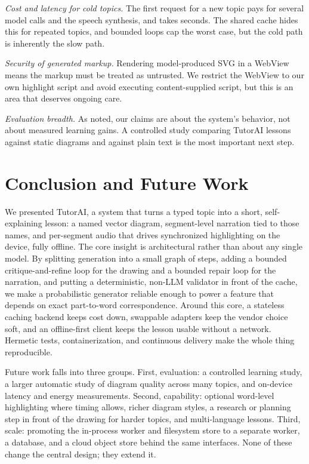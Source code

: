 \documentclass[conference]{IEEEtran}
\begin{document}
\emph{Cost and latency for cold topics.} The first request for a new topic pays
for several model calls and the speech synthesis, and takes seconds. The shared
cache hides this for repeated topics, and bounded loops cap the worst case, but
the cold path is inherently the slow path.

\emph{Security of generated markup.} Rendering model-produced SVG in a WebView
means the markup must be treated as untrusted. We restrict the WebView to our own
highlight script and avoid executing content-supplied script, but this is an area
that deserves ongoing care.

\emph{Evaluation breadth.} As noted, our claims are about the system's behavior,
not about measured learning gains. A controlled study comparing TutorAI lessons
against static diagrams and against plain text is the most important next step.

\section{Conclusion and Future Work}
\label{sec:conclusion}

We presented TutorAI, a system that turns a typed topic into a short,
self-explaining lesson: a named vector diagram, segment-level narration tied to
those names, and per-segment audio that drives synchronized highlighting on the
device, fully offline. The core insight is architectural rather than about any
single model. By splitting generation into a small graph of steps, adding a
bounded critique-and-refine loop for the drawing and a bounded repair loop for
the narration, and putting a deterministic, non-LLM validator in front of the
cache, we make a probabilistic generator reliable enough to power a feature that
depends on exact part-to-word correspondence. Around this core, a stateless
caching backend keeps cost down, swappable adapters keep the vendor choice soft,
and an offline-first client keeps the lesson usable without a network. Hermetic
tests, containerization, and continuous delivery make the whole thing
reproducible.

Future work falls into three groups. First, evaluation: a controlled learning
study, a larger automatic study of diagram quality across many topics, and
on-device latency and energy measurements. Second, capability: optional
word-level highlighting where timing allows, richer diagram styles, a research
or planning step in front of the drawing for harder topics, and multi-language
lessons. Third, scale: promoting the in-process worker and filesystem store to a
separate worker, a database, and a cloud object store behind the same interfaces.
None of these change the central design; they extend it.
\end{document}
